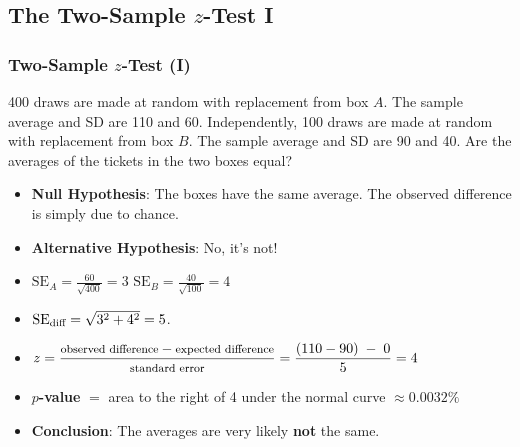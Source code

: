 \documentclass[t]{beamer}
\begin{document}
\subsection{The Two-Sample $z$-Test I}
\begin{frame}
\frametitle{Two-Sample $z$-Test (I)}
{\small

400 draws are made at random with replacement from box $A$. The sample average and SD are 110 and 60.
Independently, 100 draws are made at random with replacement from box $B$.  
The sample average and SD are 90 and 40.  Are the averages of the tickets in the two boxes equal?

\begin{itemize}
\item \textbf{\color{blue}Null Hypothesis}:  The boxes have the same average.  
   The observed difference is simply due to chance.
\item \textbf{\color{blue}Alternative Hypothesis}: No, it's not!
\item $\mbox{SE}_{A} = \frac{60}{\sqrt{400}}=3$ \hspace{.5in}
   $\mbox{SE}_{B} = \frac{40}{\sqrt{100}}= 4$
\item $\mbox{SE}_{\mbox{\scriptsize diff}} = \sqrt{3^2 + 4^2} = 5$.
\item $\displaystyle z=\frac{\mbox{\footnotesize observed difference} -
     \mbox{\footnotesize expected difference}}{\mbox{\footnotesize standard error}} = 
\frac{(110 - 90)\; -\; 0}{5} = 4$
\item \textbf{\color{blue}$p$-value} $=$ area to the right of 4 under the normal curve $\approx 0.0032\%$
\item \textbf{\color{blue}Conclusion}:  The averages are very likely \textbf{not} the same.
\end{itemize}
}
\end{frame}
\end{document}

